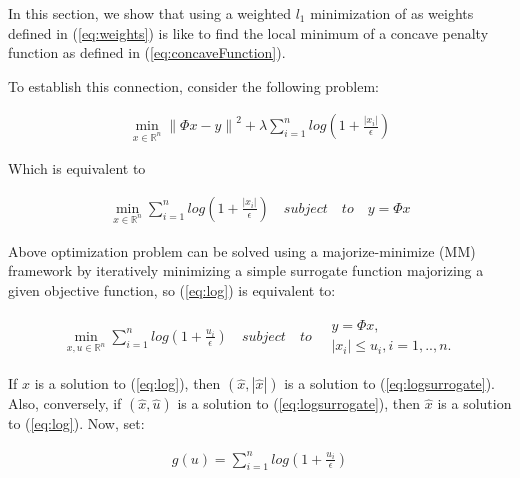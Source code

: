 In this section, we show that using a weighted $l_{1}$ minimization of as weights defined in (\ref{eq:weights}) is like to find the local minimum of a concave penalty function as defined in (\ref{eq:concaveFunction}). 

To establish this connection, consider the following problem:

\begin{equation}
\begin{gathered}
\min_{x\in \mathbb{R}^{n}}\left\|\Phi x-y\right\|^{2} + \lambda \sum_{i=1}^{n} log(1+\frac{\left | x_{i} \right |}{\epsilon })
\end{gathered}
\end{equation}

Which is equivalent to 

\begin{equation}
\label{eq:log}
\begin{gathered}
\min_{x\in \mathbb{R}^{n}} 
\sum_{i=1}^{n} log(1+\frac{\left | x_{i} \right |}{\epsilon })
\quad subject \quad to \quad y=\Phi x
\end{gathered}
\end{equation}

Above optimization problem can be solved using a majorize-minimize (MM) \cite{hunter2004} framework by iteratively minimizing a simple surrogate function majorizing a given objective function, so (\ref{eq:log}) is equivalent to:

\begin{equation}
\label{eq:logsurrogate}
\begin{gathered}
\min_{x,u\in \mathbb{R}^{n}} 
\sum_{i=1}^{n} log(1+\frac{u_{i}}{\epsilon })
\quad subject \quad to \quad \begin{matrix}
y=\Phi x,\\
\left | x_{i} \right | \leq u_{i}, i=1,..,n. 
\end{matrix}
\end{gathered}
\end{equation}

If $\hat{x}$ is a solution to (\ref{eq:log}), then $(\hat{x},\left | \hat{x}  \right |)$ is a solution to (\ref{eq:logsurrogate}). Also, conversely, if $(\hat{x},\hat{u})$ is a solution to (\ref{eq:logsurrogate}), then $\hat{x}$ is a solution to (\ref{eq:log}). Now, set:

\begin{equation}
\label{eq:funcg}
\begin{gathered}
g\left ( u \right ) =
\sum_{i=1}^{n} log(1+\frac{u_{i}}{\epsilon })
\end{gathered}
\end{equation}

